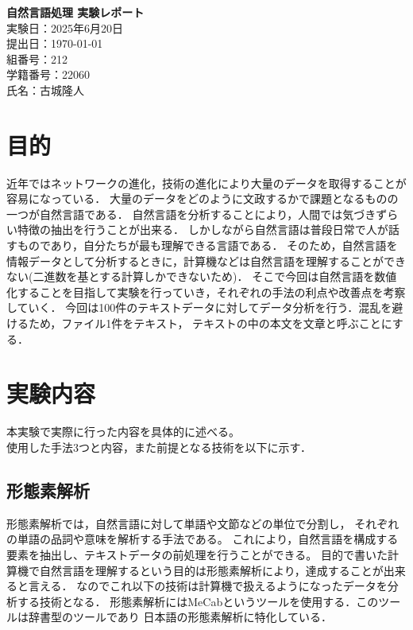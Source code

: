 \documentclass[a4paper,11pt]{ltjsarticle}
\begin{document}
\begin{titlepage}
    \begin{center}
        \vspace*{2cm}
        {\LARGE \textbf{自然言語処理 実験レポート}}\\[2cm]
        {\large 実験日：2025年6月20日}\\[0.5cm]
        {\large 提出日：\today}\\[1.5cm]
        {\large 組番号：212}\\[0.5cm]
        {\large 学籍番号：22060}\\[0.5cm]
        {\large 氏名：古城隆人}\\[2cm]
        \vfill
    \end{center}
\end{titlepage}

\section{目的}
近年ではネットワークの進化，技術の進化により大量のデータを取得することが容易になっている．
大量のデータをどのように文政するかで課題となるものの一つが自然言語である．
自然言語を分析することにより，人間では気づきずらい特徴の抽出を行うことが出来る．
しかしながら自然言語は普段日常で人が話すものであり，自分たちが最も理解できる言語である．
そのため，自然言語を情報データとして分析するときに，計算機などは自然言語を理解することができない(二進数を基とする計算しかできないため)．
そこで今回は自然言語を数値化することを目指して実験を行っていき，それぞれの手法の利点や改善点を考察していく．
今回は100件のテキストデータに対してデータ分析を行う．混乱を避けるため，ファイル1件をテキスト，
テキストの中の本文を文章と呼ぶことにする．
\section{実験内容}
本実験で実際に行った内容を具体的に述べる。\\
使用した手法3つと内容，また前提となる技術を以下に示す．
\subsection{形態素解析}
形態素解析では，自然言語に対して単語や文節などの単位で分割し，
それぞれの単語の品詞や意味を解析する手法である。
これにより，自然言語を構成する要素を抽出し、テキストデータの前処理を行うことができる。
目的で書いた計算機で自然言語を理解するという目的は形態素解析により，達成することが出来ると言える．
なのでこれ以下の技術は計算機で扱えるようになったデータを分析する技術となる．
形態素解析にはMeCabというツールを使用する．このツールは辞書型のツールであり
日本語の形態素解析に特化している．
\end{document}
